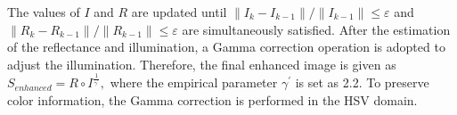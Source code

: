 The values of $I$ and $R$ are updated until $\|I_{k}-I_{k-1}\|/\|I_{k-1}\| \leq \varepsilon$ and $\|R_{k}-R_{k-1}\|/\|R_{k-1}\| \leq \varepsilon$ are simultaneously satisfied. After the estimation of  the reflectance and illumination, a Gamma correction operation is adopted to adjust the illumination. Therefore, the final enhanced image is given as $ S_{enhanced} = R \circ I^{\frac{1}{\gamma^{'}}}, \label{eq_final}$ where the empirical parameter $\gamma^{'}$ is set as 2.2. To preserve color information, the Gamma correction is performed in the HSV domain.
